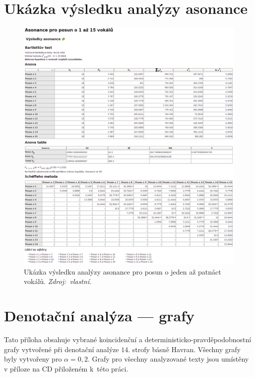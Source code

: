 \documentclass[dp.tex]{subfiles}
\begin{document}
\chapter{Ukázka výsledku analýzy asonance}
\label{appendix:asonance}
\begin{figure}[H]
	\centering
	\includegraphics[max width=\textwidth,keepaspectratio=true]{imgs-70-prakticka/assonance}
	\caption[Ukázka výsledku analýzy asonance pro posun o jeden až patnáct vokálů.]{Ukázka výsledku analýzy asonance pro posun o jeden až patnáct vokálů. \textit{Zdroj:~vlastní.}}
	\label{fig:denotation-resler-007}
\end{figure}


\chapter{Denotační analýza --- grafy}
\label{appendix:grafy}

Tato příloha obsahuje vybrané koincidenční a deterministicko-pravděpodobnostní grafy vytvořené při denotační analýze $14.$ strofy básně Havran. Všechny grafy byly vytvořeny pro $\alpha = 0{,}2$. Grafy pro všechny analyzované texty jsou umístěny v příloze na CD přiloženém k~této práci.
\end{document}

